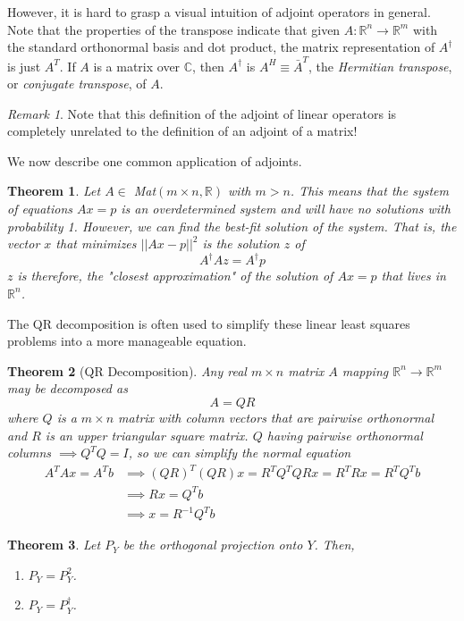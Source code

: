 \documentclass{article}
\newtheorem{theorem}{Theorem}[section]
\theoremstyle{remark}
\newtheorem*{remark}{Remark}
\theoremstyle{definition}
\begin{document}
However, it is hard to grasp a visual intuition of adjoint operators in general. Note that the properties of the transpose indicate that given $A: \mathbb{R}^n \longrightarrow \mathbb{R}^m$ with the standard orthonormal basis and dot product, the matrix representation of $A^\dagger$ is just $A^T$. If $A$ is a matrix over $\mathbb{C}$, then $A^\dagger$ is $A^H \equiv \bar{A}^T$, the \textit{Hermitian transpose}, or \textit{conjugate transpose}, of $A$. 

\begin{remark}
Note that this definition of the adjoint of linear operators is completely unrelated to the definition of an adjoint of a matrix! 
\end{remark}

We now describe one common application of adjoints. 
\begin{theorem}
Let $A \in$ Mat$(m \times n, \mathbb{R})$ with $m > n$. This means that the system of equations $A x = p$ is an overdetermined system and will have no solutions with probability 1. However, we can find the \textit{best-fit solution} of the system. That is, the vector $x$ that minimizes $||A x -p||^2$ is the solution $z$ of 
\[ A^\dagger A z = A^\dagger p\]
$z$ is therefore, the "closest approximation" of the solution of $A x = p$ that lives in $\mathbb{R}^n$. 
\end{theorem}

The QR decomposition is often used to simplify these linear least squares problems into a more manageable equation. 

\begin{theorem}[QR Decomposition]
Any real $m \times n$ matrix $A$ mapping $\mathbb{R}^n \longrightarrow \mathbb{R}^m$ may be decomposed as
\[A = Q R\] 
where $Q$ is a $m \times n$ matrix with column vectors that are pairwise orthonormal and $R$ is an upper triangular square matrix. $Q$ having pairwise orthonormal columns $\implies Q^T Q = I$, so we can simplify the normal equation
\begin{align*}
    A^T A x = A^T b & \implies (Q R)^T (Q R) x = R^T Q^T Q R x = R^T R x = R^T Q^T b \\
    & \implies R x = Q^T b \\
    & \implies x = R^{-1} Q^T b
\end{align*}
\end{theorem}

\begin{theorem}
Let $P_Y$ be the orthogonal projection onto $Y$. Then, 
\begin{enumerate}
    \item $P_Y = P_Y^2$. 
    \item $P_Y = P_Y^\dagger$. 
\end{enumerate}
\end{theorem}
\end{document}
